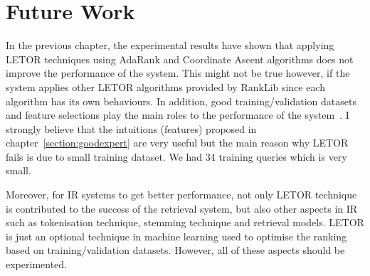 \section{Future Work}
In the previous chapter, the experimental results have shown that applying LETOR techniques using AdaRank and Coordinate Ascent algorithms 
does not improve the performance
of the system. This might not be true however, if the system applies other LETOR algorithms provided by RankLib since each algorithm has its own behaviours.
In addition, good training/validation datasets and feature selections play the main roles to the performance of the system~\cite{craig}. I strongly believe that the intuitions (features)
proposed in chapter~\ref{section:goodexpert} are very useful but the main reason why LETOR fails is due to small training dataset. 
We had 34 training queries which is very small. 

Moreover, for IR systems to get better performance, not only LETOR technique is contributed to the success of the retrieval system, but also 
other aspects in IR such as tokenisation technique, stemming technique and retrieval models.
LETOR is just an optional technique in machine learning used to optimise the ranking based 
on training/validation datasets. However, all of these aspects should be experimented.
